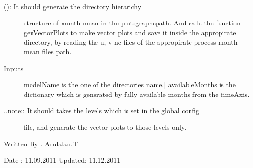 \documentclass[letterpaper,10pt,english]{sphinxmanual}
\begin{document}
\begin{fulllineitems}
\label{diagnosis:generate_winds_plots.genMonthMeanDirs}~\begin{description}
\item[{{\hyperref[diagnosis:generate_winds_plots.genMonthMeanDirs]{}} (): It should generate the directory hierarichy}] \leavevmode
structure of month mean in the plotsgraphspath. And calls the
function genVectorPlots to make vector plots and save it inside the
appropirate directory, by reading the u, v nc files of the appropirate
process month mean files path.

\item[{Inputs}] \leavevmode{[}modelName is the one of the directories name.{]}
availableMonths is the dictionary which is generated by fully
available months from the timeAxis.

\item[{..note:: It should takes the levels which is set in the global config}] \leavevmode
file, and generate the vector plots to those levels only.

\end{description}

Written By : Arulalan.T

Date : 11.09.2011
Updated: 11.12.2011

\end{fulllineitems}

\end{document}
